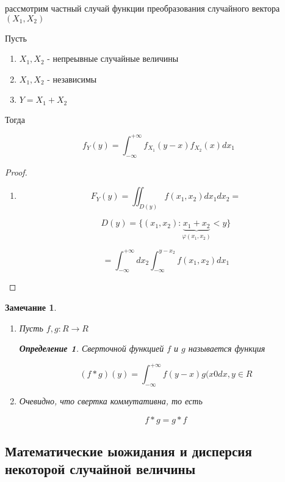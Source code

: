 \documentclass[a4paper, 14pt]{report}
\newtheorem{defenition}{Определение}[section]
\newtheorem{note}{Замечание}[section]
\begin{document}
рассмотрим частный случай функции преобразования случайного вектора $(X_1, X_2)$

\begin{theorem}
    Пусть

    \begin{enumerate}
        \item $X_1,X_2$ - непреывные случайные величины
        \item $X_1,X_2$ - независимы
        \item $Y=X_1+X_2$
    \end{enumerate}

    Тогда

    $$
    f_Y(y) = \int_{-\infty}^{+\infty} f_{X_1}(y-x) f_{X_2}(x)dx_1
    $$
\end{theorem}

\begin{proof}
    \begin{enumerate}
        \item

            $$
            F_Y(y) = \iint_{D(y)} f(x_1, x_2) dx_1dx_2 =
            $$

            $$
            D(y) = \{ (x_1,x_2) : \underbrace{x_1 + x_2}_{\varphi(x_1,x_2)} < y \}
            $$

            $$
            = \int_{-\infty}^{+\infty} dx_2 \int_{-\infty}^{y - x_2} f(x_1, x_2) dx_1
            $$
    \end{enumerate}
\end{proof}

\begin{note}
    \begin{enumerate}
    \item Пусть $f,g : R \to R$

    \begin{defenition}
        Сверточной функцией $f$ и $g$ называется функция

        $$
        (f*g)(y) = \int_{-\infty}^{+\infty} f(y-x) g(x0 dx, y \in R
        $$
    \end{defenition}

\item Очевидно, что свертка коммутативна, то есть

    $$
    f*g = g*f
    $$
    \end{enumerate}
\end{note}

\subsection{Математические ыожидания и дисперсия некоторой случайной величины}
\end{document}

